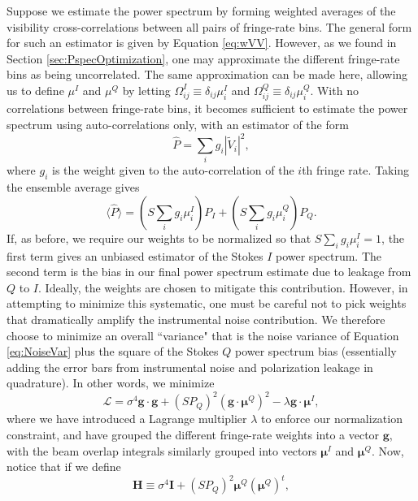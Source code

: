\documentclass[twocolumn,apj,numberedappendix]{emulateapj}
\begin{document}
Suppose we estimate the power spectrum by forming weighted averages of the visibility cross-correlations between all
pairs of fringe-rate bins. The general form for such an estimator is given by Equation \eqref{eq:wVV}. However,
as we found in Section \ref{sec:PspecOptimization}, one may approximate the different fringe-rate bins as being
uncorrelated. The same approximation can be made here, allowing us to define $\mu^I$ and $\mu^Q$ by
letting $\Omega_{ij}^I \equiv \delta_{ij} \mu_i^I$ and $\Omega_{ij}^Q \equiv \delta_{ij} \mu_i^Q$. With no
correlations between fringe-rate bins, it becomes sufficient to estimate the power spectrum using auto-correlations
only, with an estimator of the form
\begin{equation}
\widehat{P} = \sum_{i} g_{i}| \widetilde{V}_i |^2,
\end{equation}
where $g_i$ is the weight given to the auto-correlation of the $i$th fringe rate. Taking the ensemble average gives
\begin{equation}
\langle \widehat{P} \rangle = \left( S \sum_i g_i \mu^I_i \right) P_I + \left( S \sum_i g_i \mu^Q_i \right) P_Q.
\end{equation}
If, as before, we require our weights to be normalized so that $S \sum_i g_i \mu^I_i =1$, the first term gives an
unbiased estimator of the Stokes $I$ power spectrum. The second term is the bias in our final power spectrum estimate
due to leakage from $Q$ to $I$. Ideally, the weights are chosen to mitigate this contribution. However, in attempting to
minimize this systematic, one must be careful not to pick weights that dramatically amplify the instrumental noise
contribution. We therefore choose to minimize an overall ``variance" that is the noise variance of Equation
\eqref{eq:NoiseVar} plus the square of the Stokes $Q$ power spectrum bias (essentially adding the error bars
from instrumental noise and polarization leakage in quadrature). In other words, we minimize
\begin{equation}
\mathcal L = \sigma^4 \mathbf{g} \cdot \mathbf{g} + \left(S P_Q \right)^2 \left(\mathbf{g} \cdot \boldsymbol \mu^Q \right)^2 - \lambda \mathbf{g} \cdot \boldsymbol \mu^I,
\end{equation}
where we have introduced a Lagrange multiplier $\lambda$ to enforce our normalization constraint, and have grouped
the different fringe-rate weights into a vector $\mathbf{g}$, with the beam overlap integrals similarly grouped into
vectors $\boldsymbol \mu^I$ and $\boldsymbol \mu^Q$. Now, notice that if we define
\begin{equation}
\mathbf{H} \equiv \sigma^4 \mathbf{I} + \left(S P_Q \right)^2 \boldsymbol \mu^Q (\boldsymbol \mu^Q)^t,
\end{equation}
\end{document}

